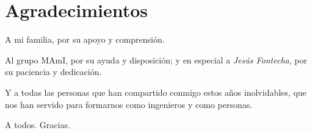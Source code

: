 
\chapter{Agradecimientos}

\vspace{0.5cm}
\begin{flushright}
A mi familia, por su apoyo y comprensión.
\end{flushright}
\vspace{0.5cm}
\begin{flushright}
Al grupo \acs{MAmI}, por su ayuda y disposición; y en especial a \emph{Jesús
Fontecha}, por su paciencia y dedicación.
\end{flushright}
\vspace{0.5cm}
\begin{flushright}
Y a todas las personas que han compartido conmigo estos años inolvidables, que
nos han servido para formarnos como ingenieros y como personas.
\end{flushright}
\vspace{0.5cm}
\begin{flushright}
A todos. Gracias.
\end{flushright}



